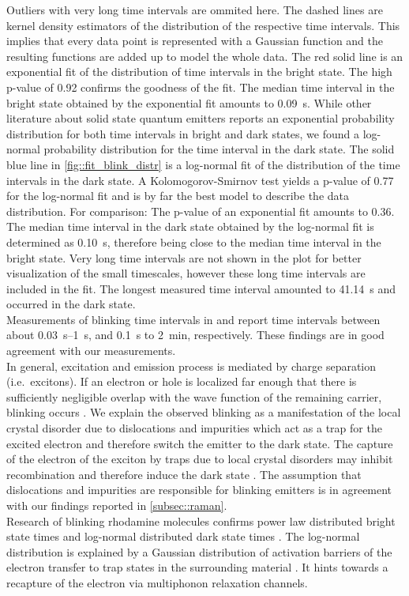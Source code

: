 		Outliers with very long time intervals are ommited here.
		The dashed lines are kernel density estimators of the distribution of the respective time intervals.
		This implies that every data point is represented with a Gaussian function and the resulting functions are added up to model the whole data.
		The red solid line is an exponential fit of the distribution of time intervals in the bright state.
		The high p-value of \num{0.92} confirms the goodness of the fit.
		The median time interval in the bright state obtained by the exponential fit amounts to \SI[separate-uncertainty]{0.09}{s}.
		While other literature about solid state quantum emitters reports an exponential probability distribution for both time intervals in bright and dark states\cite{Bradac2010,Berhane2017}, we found a log-normal probability distribution for the time interval in the dark state.
		The solid blue line in \autoref{fig::fit_blink_distr} is a log-normal fit of the distribution of the time intervals in the dark state.
		A Kolomogorov-Smirnov test yields a p-value of \num{0.77} for the log-normal fit and is by far the best model to describe the data distribution.
		For comparison: The p-value of an exponential fit amounts to \num{0.36}.
		The median time interval in the dark state obtained by the log-normal fit is determined as \SI{0.10}{s}, therefore being close to the median time interval in the bright state.
		Very long time intervals are not shown in the plot for better visualization of the small timescales, however these long time intervals are included in the fit.
		The longest measured time interval amounted to \SI{41.14}{s} and occurred in the dark state.
		\\
		Measurements of blinking time intervals in \cite{Jantzen2016} and \cite{Neu2012a} report time intervals between about \SIrange{0.03}{1}{s}, and \SI{0.1}{s} to \SI{2}{min}, respectively.
		These findings are in good agreement with our measurements.
		\\
		In general, excitation and emission process is mediated by charge separation (i.e.\ excitons).
		If an electron or hole is localized far enough that there is sufficiently negligible overlap with the wave function of the remaining carrier, blinking occurs \cite{Efros2016}.
		We explain the observed blinking as a manifestation of the local crystal disorder due to dislocations and impurities which act as a trap for the excited electron and therefore switch the emitter to the dark state.
		The capture of the electron of the exciton by traps due to local crystal disorders may inhibit recombination and therefore induce the dark state \cite{Bradac2010}.
		The assumption that dislocations and impurities are responsible for blinking emitters is in agreement with our findings reported in \ref{subsec::raman}.
		\\
		Research of blinking rhodamine molecules confirms power law distributed bright state times and log-normal distributed dark state times \cite{Wong2013}.
		The log-normal distribution is explained by a Gaussian distribution of activation barriers of the electron transfer to trap states in the surrounding material \cite{Albery1985}.
		It hints towards a recapture of the electron via multiphonon relaxation channels.
